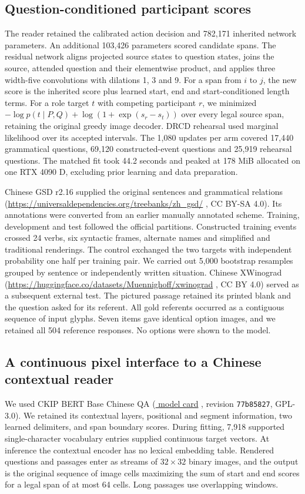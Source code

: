 \documentclass[12pt,a4paper]{article}
\providecommand{\DIFadd}[1]{{\protect\color{blue} \sf #1}} %
\begin{document}
\subsection*{\DIFadd{Question-conditioned participant scores}}
\DIFadd{The reader retained the calibrated action decision and 782,171 inherited network parameters. An additional 103,426 parameters scored candidate spans. The residual network aligns projected source states to question states, joins the source, attended question and their elementwise product, and applies three width-five convolutions with dilations 1, 3 and 9. For a span from $i$ to $j$, the new score is the inherited score plus learned start, end and start-conditioned length terms. For a role target $t$ with competing participant $r$, we minimized $-\log p(t\mid P,Q)+\log(1+\exp(s_r-s_t))$ over every legal source span, retaining the original greedy image decoder. DRCD rehearsal used marginal likelihood over its accepted intervals. The 1,080 updates per arm covered 17,440 grammatical questions, 69,120 constructed-event questions and 25,919 rehearsal questions. The matched fit took 44.2 seconds and peaked at 178 MiB allocated on one RTX 4090 D, excluding prior learning and data preparation.
}

\DIFadd{Chinese GSD r2.16 supplied the original sentences and grammatical relations (}\url{https://universaldependencies.org/treebanks/zh_gsd/}\DIFadd{, CC BY-SA 4.0). Its annotations were converted from an earlier manually annotated scheme. Training, development and test followed the official partitions. Constructed training events crossed 24 verbs, six syntactic frames, alternate names and simplified and traditional renderings. The control exchanged the two targets with independent probability one half per training pair. We carried out 5,000 bootstrap resamples grouped by sentence or independently written situation. Chinese XWinograd (}\url{https://huggingface.co/datasets/Muennighoff/xwinograd}\DIFadd{, CC BY 4.0) served as a subsequent external test. The pictured passage retained its printed blank and the question asked for its referent. All gold referents occurred as a contiguous sequence of input glyphs. Seven items gave identical option images, and we retained all 504 reference responses. No options were shown to the model.
}

\subsection*{\DIFadd{A continuous pixel interface to a Chinese contextual reader}}
\DIFadd{We used CKIP BERT Base Chinese QA (}\href{https://huggingface.co/ckiplab/bert-base-chinese-qa}{\DIFadd{model card}}\DIFadd{, revision \texttt{77b85827}, GPL-3.0). We retained its contextual layers, positional and segment information, two learned delimiters, and span boundary scores. During fitting, 7,918 supported single-character vocabulary entries supplied continuous target vectors. At inference the contextual encoder has no lexical embedding table. Rendered questions and passages enter as streams of $32\times32$ binary images, and the output is the original sequence of image cells maximizing the sum of start and end scores for a legal span of at most 64 cells. Long passages use overlapping windows.
}
\end{document}
